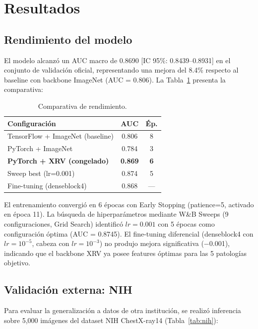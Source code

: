 \section{Resultados}
\label{sec:results}

\subsection{Rendimiento del modelo}

El modelo alcanz\'o un AUC macro de 0.8690 [IC 95\%: 0.8439--0.8931] en el conjunto de validaci\'on oficial, representando una mejora del 8.4\% respecto al baseline con backbone ImageNet (AUC = 0.806). La Tabla~\ref{tab:results-comparison} presenta la comparativa:

\begin{table}[H]
\centering
\caption{Comparativa de rendimiento.}
\label{tab:results-comparison}
\small
\begin{tabular}{lcc}
\toprule
\textbf{Configuraci\'on} & \textbf{AUC} & \textbf{\'Ep.} \\
\midrule
TensorFlow + ImageNet (baseline) & 0.806 & 8 \\
PyTorch + ImageNet & 0.784 & 3 \\
\textbf{PyTorch + XRV (congelado)} & \textbf{0.869} & \textbf{6} \\
Sweep best (lr=0.001) & 0.874 & 5 \\
Fine-tuning (denseblock4) & 0.868 & --- \\
\bottomrule
\end{tabular}
\end{table}
El entrenamiento convergi\'o en 6 \'epocas con Early Stopping (patience=5, activado en \'epoca 11). La b\'usqueda de hiperpar\'ametros mediante W\&B Sweeps (9 configuraciones, Grid Search) identific\'o $lr = 0.001$ con 5 \'epocas como configuraci\'on \'optima (AUC = 0.8745). El fine-tuning diferencial (denseblock4 con $lr = 10^{-5}$, cabeza con $lr = 10^{-3}$) no produjo mejora significativa ($-$0.001), indicando que el backbone XRV ya posee features \'optimas para las 5 patolog\'ias objetivo.
\subsection{Validaci\'on externa: NIH}

Para evaluar la generalizaci\'on a datos de otra instituci\'on, se realiz\'o inferencia sobre 5,000 im\'agenes del dataset NIH ChestX-ray14 \cite{wang2017chestxray} (Tabla~\ref{tab:nih}):

